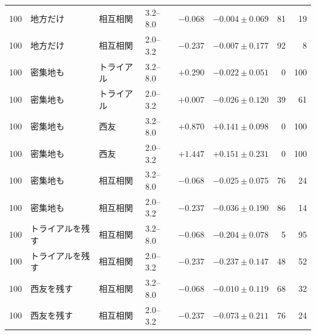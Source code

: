 \begin{tabular}{llllrrrr}
100 & 地方だけ & 相互相関 & 3.2--8.0 & $-0.068$ & $-0.004 \pm 0.069$ & 81 & 19 \\
100 & 地方だけ & 相互相関 & 2.0--3.2 & $-0.237$ & $-0.007 \pm 0.177$ & 92 & 8 \\
100 & 密集地も & トライアル & 3.2--8.0 & $+0.290$ & $-0.022 \pm 0.051$ & 0 & 100 \\
100 & 密集地も & トライアル & 2.0--3.2 & $+0.007$ & $-0.026 \pm 0.120$ & 39 & 61 \\
100 & 密集地も & 西友 & 3.2--8.0 & $+0.870$ & $+0.141 \pm 0.098$ & 0 & 100 \\
100 & 密集地も & 西友 & 2.0--3.2 & $+1.447$ & $+0.151 \pm 0.231$ & 0 & 100 \\
100 & 密集地も & 相互相関 & 3.2--8.0 & $-0.068$ & $-0.025 \pm 0.075$ & 76 & 24 \\
100 & 密集地も & 相互相関 & 2.0--3.2 & $-0.237$ & $-0.036 \pm 0.190$ & 86 & 14 \\
100 & トライアルを残す & 相互相関 & 3.2--8.0 & $-0.068$ & $-0.204 \pm 0.078$ & 5 & 95 \\
100 & トライアルを残す & 相互相関 & 2.0--3.2 & $-0.237$ & $-0.237 \pm 0.147$ & 48 & 52 \\
100 & 西友を残す & 相互相関 & 3.2--8.0 & $-0.068$ & $-0.010 \pm 0.119$ & 68 & 32 \\
100 & 西友を残す & 相互相関 & 2.0--3.2 & $-0.237$ & $-0.073 \pm 0.211$ & 76 & 24 \\
\bottomrule
\end{tabular}
